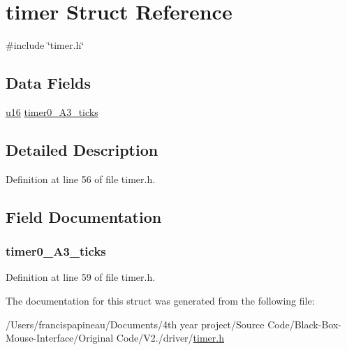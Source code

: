 \hypertarget{structtimer}{\section{timer \-Struct \-Reference}
\label{structtimer}
}


{\ttfamily \#include \char`\"{}timer.\-h\char`\"{}}

\subsection*{\-Data \-Fields}
\begin{DoxyCompactItemize}
\item 
\hyperlink{main__ED__BM_8c_a9e6c91d77e24643b888dbd1a1a590054}{u16} \hyperlink{structtimer_a7fb57440f88930f7509cf89d57fa6b97}{timer0\-\_\-\-A3\-\_\-ticks}
\end{DoxyCompactItemize}


\subsection{\-Detailed \-Description}


\-Definition at line 56 of file timer.\-h.



\subsection{\-Field \-Documentation}
\hypertarget{structtimer_a7fb57440f88930f7509cf89d57fa6b97}{
\subsubsection[{timer0\-\_\-\-A3\-\_\-ticks}]{ {\bf timer0\-\_\-\-A3\-\_\-ticks}}}\label{structtimer_a7fb57440f88930f7509cf89d57fa6b97}


\-Definition at line 59 of file timer.\-h.



\-The documentation for this struct was generated from the following file\-:\begin{DoxyCompactItemize}
\item 
/\-Users/francispapineau/\-Documents/4th year project/\-Source Code/\-Black-\/\-Box-\/\-Mouse-\/\-Interface/\-Original Code/\-V2./driver/\hyperlink{timer_8h}{timer.\-h}\end{DoxyCompactItemize}
